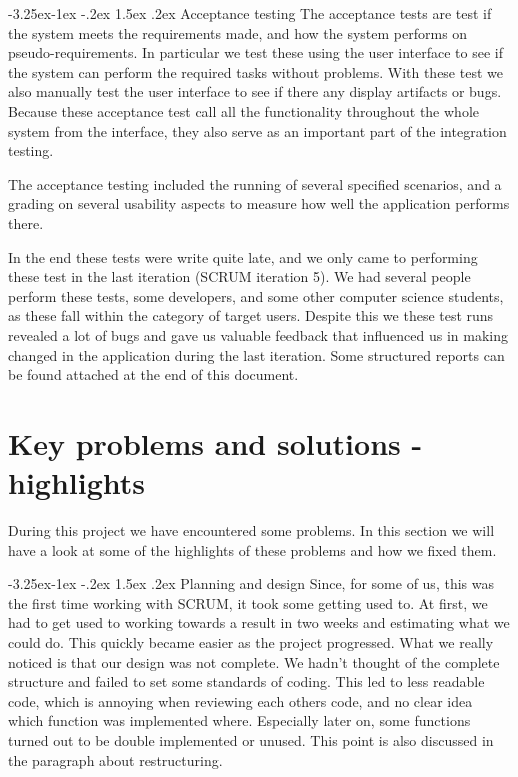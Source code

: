 \documentclass[a4paper]{article}
\makeatletter
\renewcommand\paragraph{\@startsection{paragraph}{4}{\z@}%
  {-3.25ex\@plus -1ex \@minus -.2ex}%
  {1.5ex \@plus .2ex}%
  {\normalfont\normalsize\bfseries}}
\makeatother
\begin{document}
\paragraph{Acceptance testing}
 The acceptance tests
are test if the system meets the requirements made, and how the system performs on pseudo-requirements.
In particular we test these using the user interface to see if the system can perform the required tasks without
problems. With these test we also manually test the user interface to see if there any display artifacts or
bugs. Because these acceptance test call all the functionality throughout the whole system from the interface,
they also serve as an important part of the integration testing.

The acceptance testing included the running of several specified scenarios, and a grading on several usability aspects to measure how well the application performs there.

In the end these tests were write quite late, and we only came to performing these test in the last iteration (SCRUM iteration 5). We had several people perform these tests, some developers, and some other computer science students, as these fall within the category of target users. Despite this we these test runs revealed a lot of bugs and gave us valuable feedback that influenced us in making changed in the application during the last iteration. Some structured reports can be found attached at the end of this document.


\pagebreak
\section{Key problems and solutions - highlights}
\label{problems-solutions-highlights}

During this project we have encountered some problems. In this section we will have a look at some of the highlights of these problems and how we fixed them.

\paragraph{Planning and design}
Since, for some of us, this was the first time working with SCRUM, it took some getting used to. At first, we had to get used to working towards a result in two weeks and estimating what we could do. This quickly became easier as the project progressed. 
What we really noticed is that our design was not complete. We hadn't thought of the complete structure and failed to set some standards of coding. This led to less readable code, which is annoying when reviewing each others code, and no clear idea which function was implemented where. Especially later on, some functions turned out to be double implemented or unused. This point is also discussed in the paragraph about restructuring.
\end{document}
